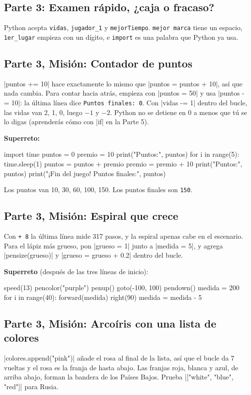 \subsection*{Parte 3: Examen rápido, ¿caja o fracaso?}
Python acepta \texttt{vidas}, \texttt{jugador\_1} y \texttt{mejorTiempo}. \texttt{mejor marca} tiene un espacio, \texttt{1er\_lugar} empieza con un dígito, e \texttt{import} es una palabra que Python ya usa.

\subsection*{Parte 3, Misión: Contador de puntos}
\py|puntos += 10| hace exactamente lo mismo que \py|puntos = puntos + 10|, así que nada cambia. Para contar hacia atrás, empieza con \py|puntos = 50| y usa \py|puntos -= 10|: la última línea dice \texttt{Puntos finales: 0}. Con \py|vidas -= 1| dentro del bucle, las vidas van 2, 1, 0, luego $-1$ y $-2$. Python no se detiene en 0 a menos que tú se lo digas (aprenderás cómo con \py|if| en la Parte 5).

\textbf{Superreto:}
\begin{codenonum}
import time
puntos = 0
premio = 10
print("Puntos:", puntos)
for i in range(5):
    time.sleep(1)
    puntos = puntos + premio
    premio = premio + 10
    print("Puntos:", puntos)
print("¡Fin del juego! Puntos finales:", puntos)
\end{codenonum}
Los puntos van 10, 30, 60, 100, 150. Los puntos finales son \texttt{150}.

\subsection*{Parte 3, Misión: Espiral que crece}
Con \texttt{+ 8} la última línea mide 317 pasos, y la espiral apenas cabe en el escenario. Para el lápiz más grueso, pon \py|grueso = 1| junto a \py|medida = 5|, y agrega \py|pensize(grueso)| y \py|grueso = grueso + 0.2| dentro del bucle.

\textbf{Superreto} (después de las tres líneas de inicio):
\begin{codenonum}
speed(13)
pencolor("purple")
penup()
goto(-100, 100)
pendown()
medida = 200
for i in range(40):
    forward(medida)
    right(90)
    medida = medida - 5
\end{codenonum}

\subsection*{Parte 3, Misión: Arcoíris con una lista de colores}
\py|colores.append("pink")| añade el rosa al final de la lista, así que el bucle da 7 vueltas y el rosa es la franja de hasta abajo. Las franjas roja, blanca y azul, de arriba abajo, forman la bandera de los Países Bajos. Prueba \py|["white", "blue", "red"]| para Rusia.

